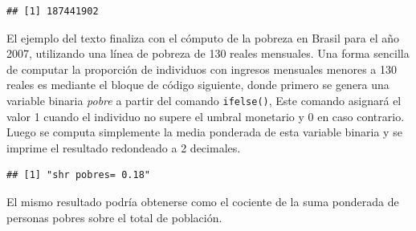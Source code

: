 \documentclass[
]{book}
\newenvironment{Shaded}{\begin{snugshade}}{\end{snugshade}}
\newcommand{\AttributeTok}[1]{\textcolor[rgb]{0.77,0.63,0.00}{#1}}
\newcommand{\CommentTok}[1]{\textcolor[rgb]{0.56,0.35,0.01}{\textit{#1}}}
\newcommand{\DecValTok}[1]{\textcolor[rgb]{0.00,0.00,0.81}{#1}}
\newcommand{\DocumentationTok}[1]{\textcolor[rgb]{0.56,0.35,0.01}{\textbf{\textit{#1}}}}
\newcommand{\FloatTok}[1]{\textcolor[rgb]{0.00,0.00,0.81}{#1}}
\newcommand{\FunctionTok}[1]{\textcolor[rgb]{0.00,0.00,0.00}{#1}}
\newcommand{\NormalTok}[1]{#1}
\newcommand{\OtherTok}[1]{\textcolor[rgb]{0.56,0.35,0.01}{#1}}
\newcommand{\SpecialCharTok}[1]{\textcolor[rgb]{0.00,0.00,0.00}{#1}}
\newcommand{\StringTok}[1]{\textcolor[rgb]{0.31,0.60,0.02}{#1}}
\begin{document}
\begin{Shaded}
\end{Shaded}

\begin{verbatim}
## [1] 187441902
\end{verbatim}

El ejemplo del texto finaliza con el cómputo de la pobreza en Brasil para el año 2007, utilizando una línea de pobreza de 130 reales mensuales. Una forma sencilla de computar la proporción de individuos con ingresos mensuales menores a 130 reales es mediante el bloque de código siguiente, donde primero se genera una variable binaria \emph{pobre} a partir del comando \texttt{ifelse()}, Este comando asignará el valor 1 cuando el individuo no supere el umbral monetario y 0 en caso contrario. Luego se computa simplemente la media ponderada de esta variable binaria y se imprime el resultado redondeado a 2 decimales.

\begin{Shaded}
\end{Shaded}

\begin{verbatim}
## [1] "shr pobres= 0.18"
\end{verbatim}

El mismo resultado podría obtenerse como el cociente de la suma ponderada de personas pobres sobre el total de población.
\end{document}
